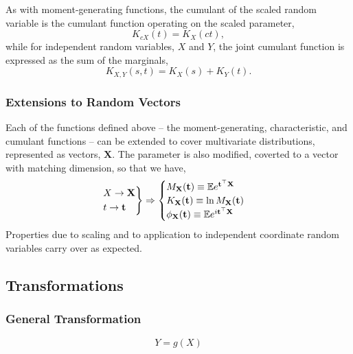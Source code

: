 \documentclass[12pt, twoside, draft]{article}
\begin{document}
As with moment-generating functions, the cumulant of the scaled random variable is the cumulant function operating on the scaled parameter,
\begin{equation}
K_{cX}(t) = K_X(ct),
\end{equation}
while for independent random variables, $X$ and $Y$, the joint cumulant function is expressed as the sum of the marginals,
\begin{equation}
K_{X,Y}(s, t) = K_X(s) + K_Y(t).
\end{equation}

\subsubsection{Extensions to Random Vectors}\label{sec:extensions_random_vectors}
Each of the functions defined above -- the moment-generating, characteristic, and cumulant functions -- can be extended to cover multivariate distributions, represented as vectors, $\mathbf{X}$.  The parameter is also modified, coverted to a vector with matching dimension, so that we have,
\begin{equation}
\begin{rcases}
X \rightarrow \mathbf{X} \\
t \rightarrow \mathbf{t}
\end{rcases} \Rightarrow
\begin{cases}
M_{\mathbf{X}}(\mathbf{t}) \equiv \mathbb{E}e^{\mathbf{t}^\top \mathbf{X}} \\
K_{\mathbf{X}}(\mathbf{t}) \equiv \ln M_{\mathbf{X}}(\mathbf{t}) \\
\phi_{\mathbf{X}}(\mathbf{t}) \equiv \mathbb{E}e^{i\mathbf{t}^\top \mathbf{X}}
\end{cases}
\end{equation}
Properties due to scaling and to application to independent coordinate random variables carry over as expected.

\subsection{Transformations}\label{sec:transformations}
\subsubsection{General Transformation}\label{sec:general_transformation}
\begin{equation}
Y = g(X)
\end{equation}
\end{document}
